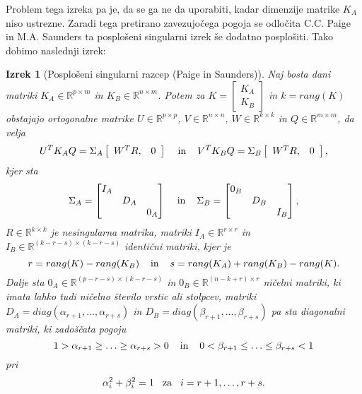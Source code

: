 \documentclass[mat1]{article}
\newtheorem{izrek}{Izrek}
\theoremstyle{definition}
\begin{document}
Problem tega izreka pa je, da se ga ne da uporabiti, kadar dimenzije matrike $K_A$ niso ustrezne. Zaradi tega pretirano zavezujočega pogoja se odločita C.C. Paige in M.A. Saunders ta posplošeni singularni izrek še dodatno posplošiti. Tako dobimo naslednji izrek:
\begin{izrek}[Posplošeni singularni razcep (Paige in Saunders)]\label{GSVD2}
\label{izrek:GSVD} Naj bosta dani matriki $K_A \in \mathbb{R}^{p \times m}$ in $K_B \in \mathbb{R}^{n \times m}$. Potem za $K = \left[\begin{array}{c} K_A \\ K_B \end{array}\right]$ in $k = rang(K)$ obstajajo ortogonalne matrike $U \in \mathbb{R}^{p \times p}$, $V \in \mathbb{R}^{n \times n}$, $W \in \mathbb{R}^{k \times k}$ in $Q \in \mathbb{R}^{m \times m}$, da velja 
\begin{equation} \label{eq4}
U^T K_A Q = \Sigma_A  \left[\begin{array}{cc} W^T R, & 0 \end{array}\right] \hspace{4mm} \text{in} \hspace{4mm} V^T K_B Q = \Sigma_B  \left[\begin{array}{cc} W^T R, & 0 \end{array}\right] \text{,}
\end{equation} kjer sta
$$\Sigma_A = \begin{bmatrix} 
I_A &  & \\
 & D_A & \\
 & & 0_A  
\end{bmatrix} \hspace{4mm} \text{in} \hspace{4mm}
\Sigma_B = \begin{bmatrix} 
0_B &  & \\
 & D_B & \\
 & & I_B  
\end{bmatrix} \text{,}$$ 
$R \in \mathbb{R}^{k \times k}$ je nesingularna matrika, matriki $I_A \in \mathbb{R}^{r \times r}$ in $I_B \in \mathbb{R}^{(k-r-s) \times (k-r-s)}$ identični matriki, kjer je 
$$r = rang(K) - rang(K_B) \hspace{4mm} \text{in} \hspace{4mm} s = rang(K_A) + rang(K_B) - rang(K) \text{.}$$
Dalje sta $0_A \in \mathbb{R}^{(p-r-s) \times (k-r-s)}$ in $0_B \in \mathbb{R}^{(n-k+r) \times r}$ ničelni matriki, ki imata lahko tudi ničelno število vrstic ali stolpcev, matriki
$D_A = diag(\alpha_{r+1},..., \alpha_{r+s})$ in $D_B = diag(\beta_{r+1},..., \beta_{r+s})$ pa sta diagonalni matriki, ki zadoščata pogoju
$$1 > \alpha_{r+1} \geq \ldots \geq \alpha_{r+s} > 0 \hspace{4mm} \text{in} \hspace{4mm} 0 < \beta_{r+1} \leq \ldots \leq \beta_{r+s} < 1$$
pri
\begin{equation} \label{alpha+beta-GSVD}
\alpha_i^2 + \beta_i^2 = 1 \hspace{3mm} \text{za} \hspace{3mm} i = r+1,\ldots, r+s
\text{.}
\end{equation}
\end{izrek}
\end{document}
